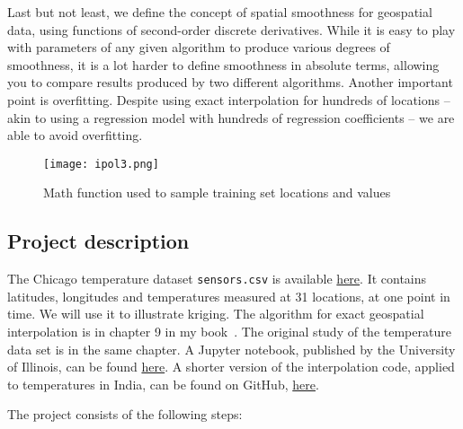 \documentclass[oneside,10pt]{book}
\begin{document}
Last but not least, we define the concept of \textcolor{index}{spatial smoothness} for geospatial data, using functions of second-order discrete derivatives. While it is easy to play with parameters of any given algorithm to produce various degrees of smoothness, it is a lot harder
 to define smoothness in absolute terms, allowing you to compare results produced by two different
 algorithms. Another important point is overfitting. Despite using exact interpolation for hundreds of locations -- akin to using a regression model with hundreds of regression coefficients -- we are able to avoid overfitting. 

\begin{figure}[H]
\centering
\texttt{[image: ipol3.png]}   
\caption{Math function used to sample training set locations and values}
\label{fig:gretelbwacxzad}
\end{figure}

 \subsection{Project description}

The Chicago temperature dataset \texttt{sensors.csv} is available 
  \href{https://raw.githubusercontent.com/VincentGranville/Statistical-Optimization/main/sensors.csv}{here}. It contains latitudes, longitudes and temperatures measured at 31 locations, at one point in time. We will use it to illustrate kriging. The algorithm for exact geospatial interpolation is in chapter 9 
 in my book~\cite{vgelsevier}. The original study of the temperature data set is in the same chapter.
 A Jupyter notebook, published by the University of Illinois,  can be found \href{https://cybergisxhub.cigi.illinois.edu/wp-content/uploads/2019/12/Spatial_interpolation.html}{here}. A shorter version of the interpolation code, applied to temperatures in India, can be found on GitHub, \href{https://github.com/VincentGranville/Statistical-Optimization/blob/main/interpol_temperatures_india.py}{here}.
\vspace{1ex}

\noindent The project consists of the following steps:\vspace{1ex}
\end{document}
